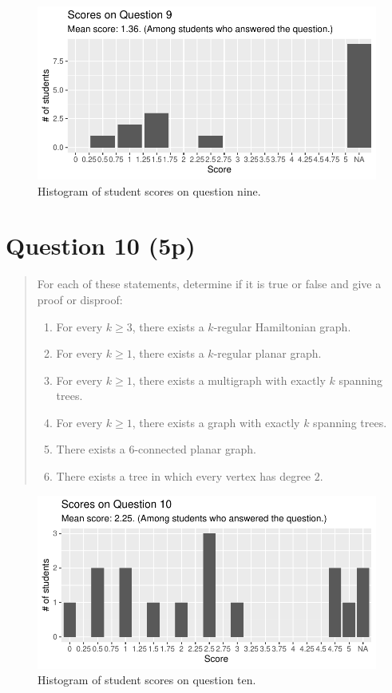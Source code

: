 \documentclass[nobib]{tufte-handout}
\begin{document}
\begin{figure}[p]
  \centering
  \includegraphics[width = \textwidth]{Q9.pdf}
  \caption[Score histogram for Q9]{Histogram of student scores on question nine.}
  \label{fig:Q9}
\end{figure}

\section{Question 10 (5p)} %

\begin{quotation}
  For each of these statements, determine if it is true or false and give a proof or disproof:
  \begin{enumerate}[label=\alph*)]
    \item For every $k\geq 3$, there exists a $k$-regular Hamiltonian graph.
    \item For every $k \geq 1$, there exists a $k$-regular planar graph.
    \item For every $k \geq 1$, there exists a multigraph with exactly $k$ spanning trees.
    \item For every $k \geq 1$, there exists a graph with exactly $k$ spanning trees.
    \item There exists a $6$-connected planar graph.
    \item There exists a tree in which every vertex has degree $2$.
  \end{enumerate}
\end{quotation}

\begin{figure}[p]
  \centering
  \includegraphics[width = \textwidth]{Q10.pdf}
  \caption[Score histogram for Q10]{Histogram of student scores on question ten.}
  \label{fig:Q10}
\end{figure}
\end{document}

